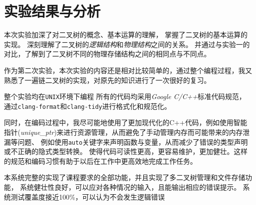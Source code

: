 \section{实验结果与分析}\label{sec:test34}
本次实验加深了对二叉树的概念、基本运算的理解，
掌握了二叉树的基本运算的实现。
深刻理解了二叉树的\emph{逻辑结构}和\emph{物理结构}之间的关系。
并通过与实验一的对比，了解到了二叉树不同的物理存储结构之间的相同点与不同点。
\par
作为第二次实验，本次实验的内容还是相对比较简单的，通过整个编程过程，我又熟悉了一遍链二叉树的实现，对原先的知识进行了一次很好的复习。
\par 整个实验均在\texttt{UNIX}环境下编程
所有的代码均采用\emph{Google C/C++}标准代码规范，
通过\texttt{clang-format}和\texttt{clang-tidy}进行格式化和规范化。
\par
同时，在编码过程中，我尽可能地使用了更加现代化的C++代码，例如使用智能指针(\textit{unique\_ptr})来进行资源管理，从而避免了手动管理内存而可能带来的内存泄漏等问题、
例如使用\texttt{auto}关键字来声明函数与变量，从而减少了错误的类型声明或不正确的隐式类型转换。
使得代码可读性更高，更容易维护，更加健壮。这样的规范和编码习惯有助于以后在工作中更高效地完成工作任务。
\par
本系统完整的实现了课程要求的全部功能，并且实现了多二叉树管理和文件存储功能，
系统健壮性良好，可以应对各种情况的输入，且能输出相应的错误提示。
系统测试覆盖度接近100\%，可以认为不会发生逻辑错误
\par

